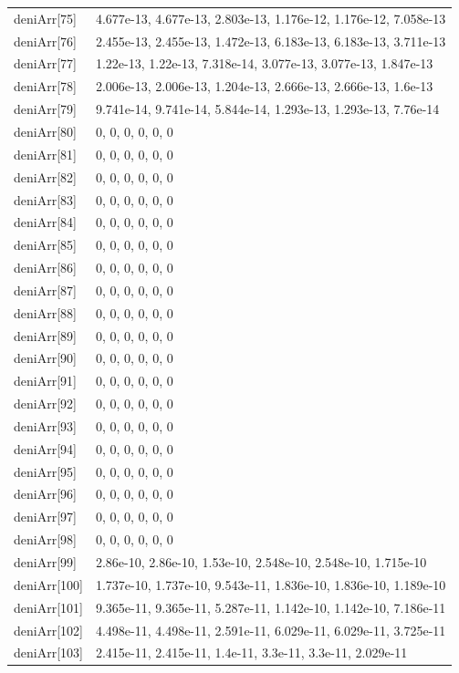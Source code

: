 {\begin{longtable}{p{}p{}}
{}deniArr[75] & 4.677e-13, 4.677e-13, 2.803e-13, 1.176e-12, 1.176e-12, 7.058e-13\\
{}deniArr[76] & 2.455e-13, 2.455e-13, 1.472e-13, 6.183e-13, 6.183e-13, 3.711e-13\\
{}deniArr[77] & 1.22e-13, 1.22e-13, 7.318e-14, 3.077e-13, 3.077e-13, 1.847e-13\\
{}deniArr[78] & 2.006e-13, 2.006e-13, 1.204e-13, 2.666e-13, 2.666e-13, 1.6e-13\\
{}deniArr[79] & 9.741e-14, 9.741e-14, 5.844e-14, 1.293e-13, 1.293e-13, 7.76e-14\\
{}deniArr[80] & 0, 0, 0, 0, 0, 0\\
{}deniArr[81] & 0, 0, 0, 0, 0, 0\\
{}deniArr[82] & 0, 0, 0, 0, 0, 0\\
{}deniArr[83] & 0, 0, 0, 0, 0, 0\\
{}deniArr[84] & 0, 0, 0, 0, 0, 0\\
{}deniArr[85] & 0, 0, 0, 0, 0, 0\\
{}deniArr[86] & 0, 0, 0, 0, 0, 0\\
{}deniArr[87] & 0, 0, 0, 0, 0, 0\\
{}deniArr[88] & 0, 0, 0, 0, 0, 0\\
{}deniArr[89] & 0, 0, 0, 0, 0, 0\\
{}deniArr[90] & 0, 0, 0, 0, 0, 0\\
{}deniArr[91] & 0, 0, 0, 0, 0, 0\\
{}deniArr[92] & 0, 0, 0, 0, 0, 0\\
{}deniArr[93] & 0, 0, 0, 0, 0, 0\\
{}deniArr[94] & 0, 0, 0, 0, 0, 0\\
{}deniArr[95] & 0, 0, 0, 0, 0, 0\\
{}deniArr[96] & 0, 0, 0, 0, 0, 0\\
{}deniArr[97] & 0, 0, 0, 0, 0, 0\\
{}deniArr[98] & 0, 0, 0, 0, 0, 0\\
{}deniArr[99] & 2.86e-10, 2.86e-10, 1.53e-10, 2.548e-10, 2.548e-10, 1.715e-10\\
{}deniArr[100] & 1.737e-10, 1.737e-10, 9.543e-11, 1.836e-10, 1.836e-10, 1.189e-10\\
{}deniArr[101] & 9.365e-11, 9.365e-11, 5.287e-11, 1.142e-10, 1.142e-10, 7.186e-11\\
{}deniArr[102] & 4.498e-11, 4.498e-11, 2.591e-11, 6.029e-11, 6.029e-11, 3.725e-11\\
{}deniArr[103] & 2.415e-11, 2.415e-11, 1.4e-11, 3.3e-11, 3.3e-11, 2.029e-11\\

\end{longtable}}
